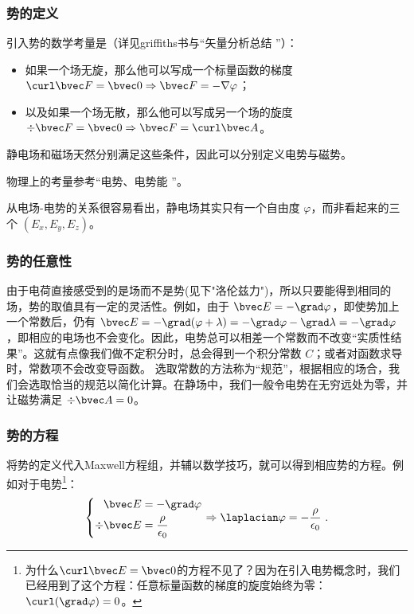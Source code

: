 \subsubsection{势的定义}
引入势的数学考量是（详见griffiths书与“矢量分析总结 ”）：
\begin{itemize}
\item 如果一个场无旋，那么他可以写成一个标量函数的梯度 $\curl \bvec F = \bvec 0 \Rightarrow \bvec F = - \nabla \varphi$；
\item 以及如果一个场无散，那么他可以写成另一个场的旋度$\div \bvec F = \bvec 0 \Rightarrow \bvec F = \curl \bvec A$。
\end{itemize}
静电场和磁场天然分别满足这些条件，因此可以分别定义电势与磁势。

物理上的考量参考“电势、电势能 ”。

从电场-电势的关系很容易看出，静电场其实只有一个自由度 $\varphi$，而非看起来的三个 $(E_x, E_y, E_z)$。

\subsubsection{势的任意性}
由于电荷直接感受到的是场而不是势(见下"洛伦兹力")，所以只要能得到相同的场，势的取值具有一定的灵活性。例如，由于 $\bvec E = -\grad \varphi$，即使势加上一个常数后，仍有 $\bvec E = -\grad (\varphi+\lambda) = -\grad \varphi - \grad \lambda = -\grad \varphi$，即相应的电场也不会变化。因此，电势总可以相差一个常数而不改变“实质性结果”。这就有点像我们做不定积分时，总会得到一个积分常数 $C$；或者对函数求导时，常数项不会改变导函数。
选取常数的方法称为“规范”，根据相应的场合，我们会选取恰当的规范以简化计算。在静场中，我们一般令电势在无穷远处为零，并让磁势满足 $\div \bvec A = 0$。

\subsubsection{势的方程}
将势的定义代入Maxwell方程组，并辅以数学技巧，就可以得到相应势的方程。例如对于电势\footnote{为什么$\curl \bvec E = \bvec 0$的方程不见了？因为在引入电势概念时，我们已经用到了这个方程：任意标量函数的梯度的旋度始终为零：$\curl (\grad \varphi) = 0$。}：
$$
\left \{
\begin{aligned}
\bvec E &= -\grad \varphi\\
\div \bvec E &= \frac{\rho}{\epsilon_0}\\
\end{aligned}
\right.
\Rightarrow
\laplacian \varphi = -\frac{\rho}{\epsilon_0}
~.
$$

